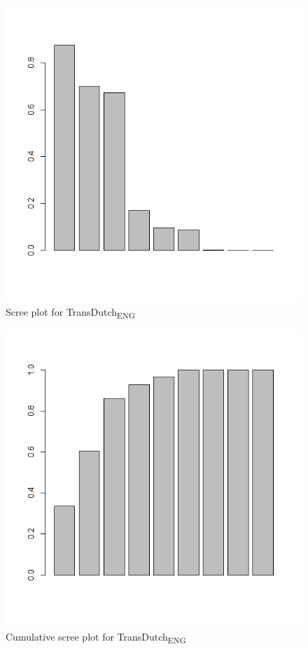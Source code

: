 \begin{figure}
\includegraphics[height=.4\textheight]{figures/Vandevoorde2-img63.png}
\caption{\label{fig:4:62}  Scree plot for TransDutch\textsubscript{ENG}}
\end{figure}

\begin{figure}
\includegraphics[height=.4\textheight]{figures/Vandevoorde2-img64.png}
\caption{\label{fig:4:63}  Cumulative scree plot for TransDutch\textsubscript{ENG}}
\end{figure}

